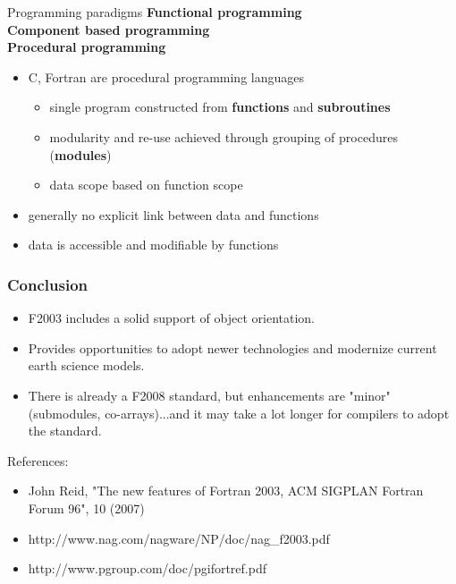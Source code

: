 \documentclass[11pt]{beamer}
\newcommand\FontCcolumn{\fontsize{10}{7.2}\selectfont}
\begin{document}
\begin{frame}{Programming paradigms}
\textbf{Functional programming}\\
\textbf{Component based programming}\\
\textbf{Procedural programming}
\begin{itemize}
  \item C, Fortran are procedural programming languages
\begin{itemize}
  \item single program constructed from \textbf{functions} and \textbf{subroutines}
 \item modularity and re-use achieved through grouping of procedures (\textbf{modules})
  \item data scope based on function scope
 \end{itemize}
 \item generally no explicit link between data and functions
  \item data is accessible and modifiable by functions
\end{itemize}

\end{frame}




\begin{frame}[fragile]
\frametitle{Conclusion}

\FontCcolumn

\begin{itemize}
\item F2003 includes a solid support of object orientation.
\item Provides opportunities to adopt newer technologies and modernize current earth science models.
\item There is already a F2008 standard, but enhancements are "minor" (submodules, co-arrays)...and it may take a lot longer for compilers to adopt the standard.
\end{itemize}

\bigskip
References:
\begin{itemize}
\item John Reid, "The new features of Fortran 2003, ACM SIGPLAN Fortran Forum 96", 10 (2007)
\item http://www.nag.com/nagware/NP/doc/nag\_f2003.pdf
\item http://www.pgroup.com/doc/pgifortref.pdf
\end{itemize}
\end{frame}
\end{document}
